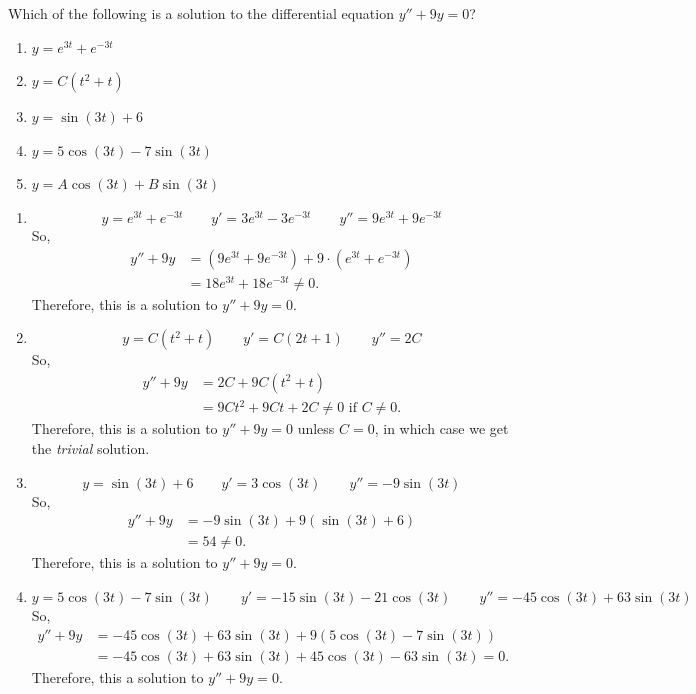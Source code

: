 \documentclass[]{ximera}
\begin{document}
\begin{problem}
Which of the following is a solution to the differential equation $y'' + 9y = 0$?
	\begin{enumerate}
	\item  $y=e^{3t}+e^{-3t}$
	\item  $y=C(t^2 + t)$
	\item  $y=\sin(3t) + 6$
	\item  $y=5 \cos(3t) - 7 \sin(3t)$
	\item  $y=A \cos(3t) + B \sin(3t)$ 
	\end{enumerate}
	
	\begin{freeResponse}
	\begin{enumerate}
	
	\item  \[ y = e^{3t}+e^{-3t} 	\qquad	y'=3e^{3t}-3e^{-3t} 	\qquad	y''=9e^{3t}+9e^{-3t} \]  
	So,
		\begin{align*}
		y''+9y &= (9e^{3t}+9e^{-3t}) + 9\cdot (e^{3t}+e^{-3t})  \\
		&= 18e^{3t} + 18e^{-3t} \neq 0.
		\end{align*}
	Therefore, this is  a solution to $y''+9y=0$.
	
	
	
	\item  \[ y = C(t^2+t) 	\qquad	y'=C(2t+1) 	\qquad	y''=2C \] 
	So,
		\begin{align*}
		y''+9y &= 2C + 9C(t^2+t)  \\
		&= 9Ct^2 + 9Ct + 2C \neq 0 \text{ if } C \neq 0.
		\end{align*}
	Therefore, this is  a solution to $y''+9y=0$ unless $C=0$, in which case we get the {\it trivial} solution.
	
	
	
	\item  \[ y = \sin(3t)+6 	\qquad	y'=3\cos(3t) 	\qquad	y''=-9\sin(3t) \]  
	So,
		\begin{align*}
		y''+9y 
		&= -9\sin(3t) +9(\sin(3t) + 6)  \\
		&= 54 \neq 0.
		\end{align*}
	Therefore, this is  a solution to $y''+9y=0$.
	
	
	
	\item  \[ y = 5\cos(3t)-7\sin(3t) 	\qquad	y'=-15\sin(3t)-21\cos(3t) 	\qquad	y''=-45\cos(3t)+63\sin(3t) \]  
	So,
		\begin{align*}
		y''+9y 
		&= -45\cos(3t)+63\sin(3t) +9(5\cos(3t)-7\sin(3t))  \\
		&= -45\cos(3t)+63\sin(3t) + 45\cos(3t) - 63\sin(3t) = 0.
		\end{align*}
	Therefore, this  a solution to $y''+9y=0$.
	

\end{enumerate}
\end{freeResponse}
\end{problem}
\end{document}
